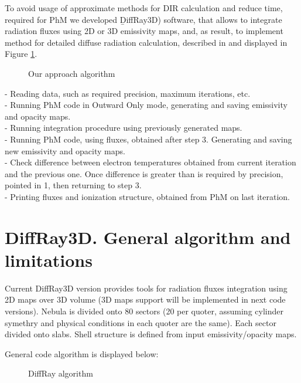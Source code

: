 \documentclass[a4paper]{article}
\begin{document}
To avoid usage of approximate methods for DIR calculation and reduce time, 
required for PhM we developed {\b DiffRay3D}) software, that allows to integrate
radiation fluxes using 2D or 3D emissivity maps, and, as result, to implement 
method for detailed diffuse radiation calculation, described in \cite{JPS2016}
and displayed in Figure \ref{our_approach}.

\begin{figure}[!h]
\centering
\begin{minipage}[t]{.45\linewidth}
\centering
{}
\caption{Our approach algorithm}\label{our_approach}
\end{minipage}
\hfill
\end{figure}

 - Reading data, such as required precision, maximum iterations, etc.\\
 - Running PhM code in Outward Only mode, generating and saving emissivity and opacity maps.\\
 - Running integration procedure using previously generated maps.\\
 - Running PhM code, using fluxes, obtained after step 3. Generating and saving new emissivity and opacity maps.\\
 - Check difference between electron temperatures obtained from current iteration and the previous one. Once difference is greater than is required by precision, pointed in 1, then returning to step 3.\\
 - Printing fluxes and ionization structure, obtained from PhM on last iteration.\\


\section{DiffRay3D. General algorithm and limitations}

Current DiffRay3D version provides tools for radiation fluxes integration 
using 2D maps over 3D volume (3D maps support will be implemented in next code
versions). Nebula is divided onto 80 sectors (20 per quoter, assuming cylinder 
symethry and physical conditions in each quoter are the same). Each sector divided 
onto slabs. Shell structure is defined from input emissivity/opacity maps.

General code algorithm is displayed below:

\begin{figure}
\begin{minipage}[t]{.45\linewidth}
\centering
{}
\caption{DiffRay algorithm}\label{diffray_algo}
\end{minipage}
\end{figure}
\end{document}
